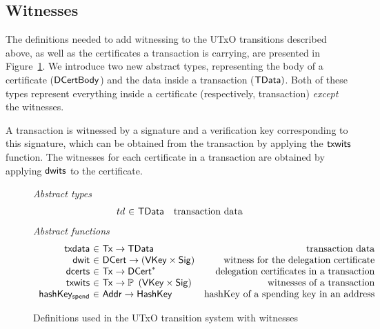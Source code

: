 \documentclass[11pt,a4paper,dvipsnames]{article}
\newcommand{\Tx}{\type{Tx}}
\newcommand{\Addr}{\type{Addr}}
\newcommand{\DCert}{\type{DCert}}
\newcommand{\DCertBody}{\type{DCertBody}}
\newcommand{\TData}{\type{TData}}
\newcommand{\VKey}{\type{VKey}}
\newcommand{\HashKey}{\type{HashKey}}
\newcommand{\Sig}{\type{Sig}}
\theoremstyle{definition}
\theoremstyle{definition}
\begin{document}
\subsection{Witnesses}
\label{sec:witnesses}

The definitions needed to add witnessing to the UTxO transitions described above,
as well as the certificates a transaction is carrying,
are presented in Figure~\ref{fig:defs:utxow}. We introduce two new abstract types,
representing the body of a certificate ($\DCertBody$) and the data inside a
transaction ($\TData)$. Both of these types represent everything inside a
certificate (respectively, transaction) \textit{except} the witnesses.

A transaction is witnessed by
a signature and a verification key corresponding to this signature, which can
be obtained from the transaction by applying the $\mathsf{txwits}$ function.
The witnesses for each certificate in a transaction are obtained by applying $\mathsf{dwits}$
to the certificate.

\begin{figure}
  \emph{Abstract types}
  \begin{equation*}
    \begin{array}{r@{~\in~}lr}
      td & \TData
      & \text{transaction data} \\
    \end{array}
  \end{equation*}
  \emph{Abstract functions}
  \begin{equation*}
    \begin{array}{r@{~\in~}lr}
      \fun{txdata} & \Tx \to \TData
      & \text{transaction data}\\
      \fun{dwit} & \DCert \to (\VKey \times \Sig)
      & \text{witness for the delegation certificate}\\
      \fun{dcerts} & \Tx \to \seqof{\DCert}
      & \text{delegation certificates in a transaction}\\
      \fun{txwits} & \Tx \to \powerset{\left(\VKey \times \Sig\right)}
      & \text{witnesses of a transaction}\\
      \fun{hashKey_{spend}} & \Addr \to \HashKey
      & \text{hashKey of a spending key in an address}\\
    \end{array}
  \end{equation*}
  \caption{Definitions used in the UTxO transition system with witnesses}
  \label{fig:defs:utxow}
\end{figure}
\end{document}
